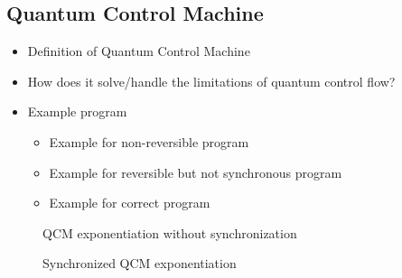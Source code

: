 \subsection{Quantum Control Machine}
\begin{itemize}
    \item Definition of Quantum Control Machine
    \item How does it solve/handle the limitations of quantum control flow?
    \item Example program
    \begin{itemize}
        \item Example for non-reversible program
        \item Example for reversible but not synchronous program
        \item Example for correct program
    \end{itemize}
\end{itemize}


\begin{figure}[htp]
    \centering     
    \begin{minipage}{.40\textwidth}
        \vspace{7.5em}
        
        \caption{QCM exponentiation without synchronization}
        \label{fig:qcm_not_sync}
    \end{minipage}
    \hfill
    \begin{minipage}{.55\textwidth}
        
        \caption{Synchronized QCM exponentiation}    
        \label{fig:qcm_sync}
    \end{minipage}
\end{figure}
